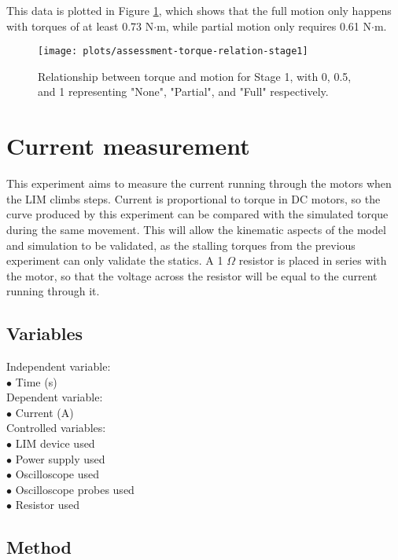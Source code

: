 This data is plotted in Figure \ref{plotassessment-torque-relation-stage1}, which shows that the full motion only happens with torques of at least 0.73 N$\cdot$m, while partial motion only requires 0.61 N$\cdot$m.

\begin{figure}[h]
	\centering
	\texttt{[image: plots/assessment-torque-relation-stage1]}
	\caption{Relationship between torque and motion for Stage 1, with 0, 0.5, and 1 representing "None", "Partial", and "Full" respectively.}
	\label{plotassessment-torque-relation-stage1}
\end{figure}

\clearpage
\section{Current measurement}
This experiment aims to measure the current running through the motors when the LIM climbs steps. Current is proportional to torque in DC motors, so the curve produced by this experiment can be compared with the simulated torque during the same movement. This will allow the kinematic aspects of the model and simulation to be validated, as the stalling torques from the previous experiment can only validate the statics. A 1 $\Omega$ resistor is placed in series with the motor, so that the voltage across the resistor will be equal to the current running through it.

\subsection{Variables}
Independent variable:\\
$\bullet$ Time (s)\\
Dependent variable:\\
$\bullet$ Current (A)\\
Controlled variables:\\
$\bullet$ LIM device used\\
$\bullet$ Power supply used\\
$\bullet$ Oscilloscope used\\
$\bullet$ Oscilloscope probes used\\
$\bullet$ Resistor used\\

\subsection{Method}


